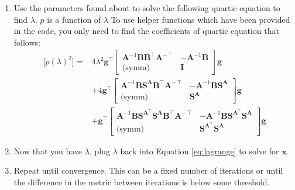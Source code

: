\documentclass[letta4 paper]{article}
\numberwithin{equation}{section}
\newcommand{\0}{\mathbf{0}}
\begin{document}
\begin{enumerate}
\begin{enumerate}
\begin{enumerate}
			\item Use the parameters found about to solve the following quartic equation to find $\lambda$. $p$ is a function of $\lambda$ To use helper functions which have been provided in the code, you only need to find the coefficients of quartic equation that follows:
			\begin{equation}
			\begin{aligned}
			\textrm{[}p(\lambda)^2\textrm{]} = 
			& 4 \lambda^2 \mathbf{g}^\intercal
			\begin{bmatrix}
			\mathbf{A}^{-1} \mathbf{B} \mathbf{B}^\intercal \mathbf{A}^{-\intercal} & -\mathbf{A}^{-1} \mathbf{B} \\
			\textrm{(symm)} & \mathbf{I} 
			\end{bmatrix} \mathbf{g}\\
			& + 4 \mathbf{g}^\intercal
			\begin{bmatrix}
			\mathbf{A}^{-1}\mathbf{B} \mathbf{S}^\mathbf{A} \mathbf{B}^\intercal \mathbf{A}^{-\intercal} & -\mathbf{A}^{-1} \mathbf{B} \mathbf{S}^\mathbf{A} \\
			\textrm{(symm)} & \mathbf{S}^\mathbf{A} 
			\end{bmatrix} \mathbf{g}\\
			& +
			\mathbf{g}^\intercal
			\begin{bmatrix}
			\mathbf{A}^{-1}\mathbf{B} \mathbf{S}^{\mathbf{A}^\intercal} \mathbf{S}^\mathbf{A} \mathbf{B}^\intercal \mathbf{A}^{-\intercal} & -\mathbf{A}^{-1} \mathbf{B} \mathbf{S}^{\mathbf{A}^\intercal} \mathbf{S}^\mathbf{A} \\
			\textrm{(symm)} & \mathbf{S}^{\mathbf{A}^\intercal} \mathbf{S}^\mathbf{A}
			\end{bmatrix} \mathbf{g}
			\end{aligned}
			\end{equation}
			
			\item Now that you have $\lambda$, plug $\lambda$ back into Equation \eqref{eq:lagrange} to solve for $\mathbf{x}$.
			
			\item Repeat until convergence. This can be a fixed number of iterations or until the difference in the metric between iterations is below some threshold.
			
			
		\end{enumerate}
		
	\end{enumerate}
	
	\end{enumerate}
	
\end{document}
